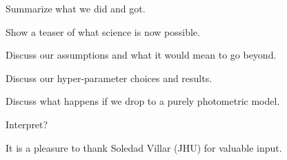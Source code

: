 \documentclass[modern]{aastex631}
\begin{document}
Summarize what we did and got.

Show a teaser of what science is now possible.

Discuss our assumptions and what it would mean to go beyond.

Discuss our hyper-parameter choices and results.

Discuss what happens if we drop to a purely photometric model.

Interpret?

\begin{acknowledgements}
It is a pleasure to thank Soledad Villar (JHU) for valuable input.
\end{acknowledgements}
\end{document}

